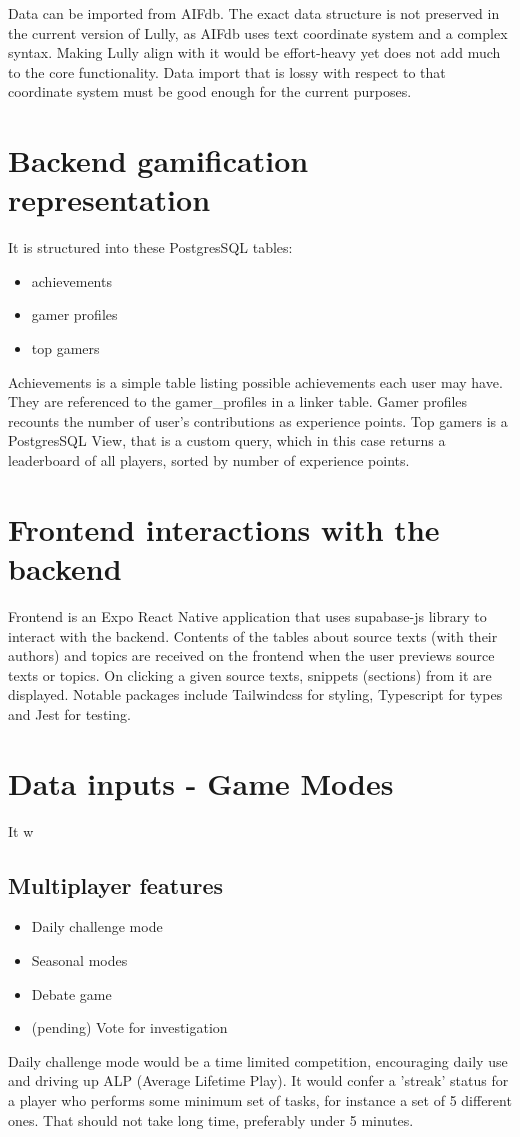 \documentclass{report}
\begin{document}
Data can be imported from AIFdb. The exact data structure is not preserved in the current version of Lully, as AIFdb uses text coordinate system and a complex syntax. Making Lully align with it would be effort-heavy yet does not add much to the core functionality. Data import that is lossy with respect to that coordinate system must be good enough for the current purposes.

\section{Backend gamification representation}

It is structured into these PostgresSQL tables:
\begin{itemize}
  \item achievements
  \item gamer profiles 
  \item top gamers 
\end{itemize}
Achievements is a simple table listing possible achievements each user may have. They are referenced to the gamer_profiles in a linker table.
 Gamer profiles recounts the number of user's contributions as experience points.
Top gamers is a PostgresSQL View, that is a custom query, which in this case returns a leaderboard of all players, sorted by number of experience points.

\section{Frontend interactions with the backend}

Frontend is an Expo \cite{noauthor_dashboard_nodate} React Native application that uses supabase-js library to interact with the backend.
Contents of the tables about source texts (with their authors) and topics are received on the frontend when the user previews source texts or topics. On clicking a given source texts, snippets (sections) from it are displayed.
Notable packages include Tailwindcss for styling, Typescript for types and Jest for testing. 

\section{Data inputs - Game Modes}
It w
\subsection{Multiplayer features}
\begin{itemize}
  \item Daily challenge mode
  \item Seasonal modes
  \item Debate game
  \item (pending) Vote for investigation
\end{itemize}
Daily challenge mode would be a time limited competition, encouraging daily use and driving up ALP (Average Lifetime Play). It would confer a 'streak' status for a player who performs some minimum set of tasks, for instance a set of 5 different ones. That should not take long time, preferably under 5 minutes.
\end{document}
